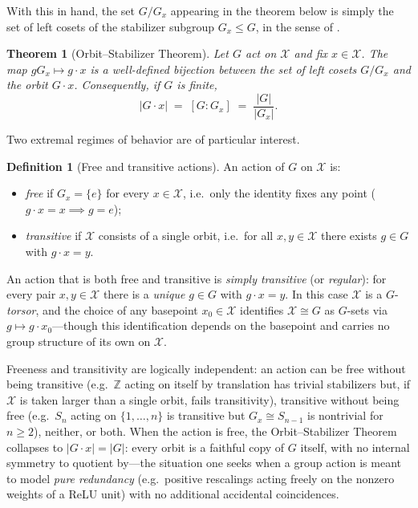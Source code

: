\documentclass[11pt]{article}
\theoremstyle{plain}
\newtheorem{Theorem}{Theorem}[section]
\theoremstyle{definition}
\newtheorem{Definition}{Definition}[section]
\begin{document}
With this in hand, the set $G/G_x$ appearing in the theorem below is simply
the set of left cosets of the stabilizer subgroup $G_x \leq G$, in the sense
of .

\begin{Theorem}[Orbit--Stabilizer Theorem]
\label{thm:orbit-stabilizer}
Let $G$ act on $\mathcal{X}$ and fix $x \in \mathcal{X}$. The map $g G_x \mapsto g \cdot x$ is a
well-defined bijection between the set of left cosets $G / G_x$ and the
orbit $G \cdot x$. Consequently, if $G$ is finite,
\[
    |G \cdot x| \;=\; [G : G_x] \;=\; \frac{|G|}{|G_x|}.
\]
\end{Theorem}

Two extremal regimes of behavior are of particular interest.

\begin{Definition}[Free and transitive actions]
\label{def:free-transitive}
An action of $G$ on $\mathcal{X}$ is:
\begin{itemize}
    \item \emph{free} if $G_x = \{e\}$ for every $x \in \mathcal{X}$, i.e.\ only the
    identity fixes any point ($g \cdot x = x \implies g = e$);
    \item \emph{transitive} if $\mathcal{X}$ consists of a single orbit, i.e.\ for all
    $x, y \in \mathcal{X}$ there exists $g \in G$ with $g \cdot x = y$.
\end{itemize}
An action that is both free and transitive is \emph{simply transitive} (or
\emph{regular}): for every pair $x, y \in \mathcal{X}$ there is a \emph{unique}
$g \in G$ with $g \cdot x = y$. In this case $\mathcal{X}$ is a $G$-\emph{torsor}, and
the choice of any basepoint $x_0 \in \mathcal{X}$ identifies $\mathcal{X} \cong G$ as $G$-sets via
$g \mapsto g \cdot x_0$---though this identification depends on the
basepoint and carries no group structure of its own on $\mathcal{X}$.
\end{Definition}

Freeness and transitivity are logically independent: an action can be free
without being transitive (e.g.\ $\mathbb{Z}$ acting on itself by translation
has trivial stabilizers but, if $\mathcal{X}$ is taken larger than a single orbit,
fails transitivity), transitive without being free (e.g.\ $S_n$ acting on
$\{1,\dots,n\}$ is transitive but $G_x \cong S_{n-1}$ is nontrivial for
$n \geq 2$), neither, or both. When the action is free, the Orbit--Stabilizer
Theorem collapses to $|G \cdot x| = |G|$: every orbit is a faithful copy of
$G$ itself, with no internal symmetry to quotient by---the situation one
seeks when a group action is meant to model \emph{pure redundancy} (e.g.\
positive rescalings acting freely on the nonzero weights of a ReLU unit) with
no additional accidental coincidences.
\end{document}
